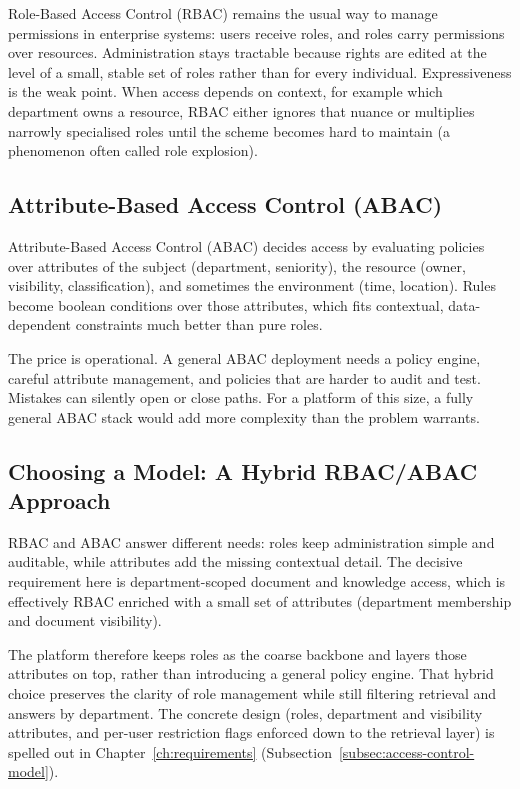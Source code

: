 Role-Based Access Control (RBAC) \cite{sandhu1996rbac, ferraiolo2001rbac} remains
the usual way to manage permissions in enterprise systems: users receive roles,
and roles carry permissions over resources. Administration stays tractable
because rights are edited at the level of a small, stable set of roles rather than
for every individual. Expressiveness is the weak point. When access depends on
context, for example which department owns a resource, RBAC either ignores that
nuance or multiplies narrowly specialised roles until the scheme becomes hard to
maintain (a phenomenon often called role explosion).

\subsection{Attribute-Based Access Control (ABAC)}

Attribute-Based Access Control (ABAC) \cite{hu2014abac} decides access by
evaluating policies over attributes of the subject (department, seniority), the
resource (owner, visibility, classification), and sometimes the environment
(time, location). Rules become boolean conditions over those attributes, which
fits contextual, data-dependent constraints much better than pure roles.

The price is operational. A general ABAC deployment needs a policy engine, careful
attribute management, and policies that are harder to audit and test. Mistakes
can silently open or close paths. For a platform of this size, a fully general
ABAC stack would add more complexity than the problem warrants.

\subsection{Choosing a Model: A Hybrid RBAC/ABAC Approach}

RBAC and ABAC answer different needs: roles keep administration simple and
auditable, while attributes add the missing contextual detail. The decisive
requirement here is department-scoped document and knowledge access, which is
effectively RBAC enriched with a small set of attributes (department membership
and document visibility).

The platform therefore keeps roles as the coarse backbone and layers those
attributes on top, rather than introducing a general policy engine. That hybrid
choice preserves the clarity of role management while still filtering retrieval
and answers by department. The concrete design (roles, department and visibility
attributes, and per-user restriction flags enforced down to the retrieval
layer) is spelled out in Chapter~\ref{ch:requirements}
(Subsection~\ref{subsec:access-control-model}).

